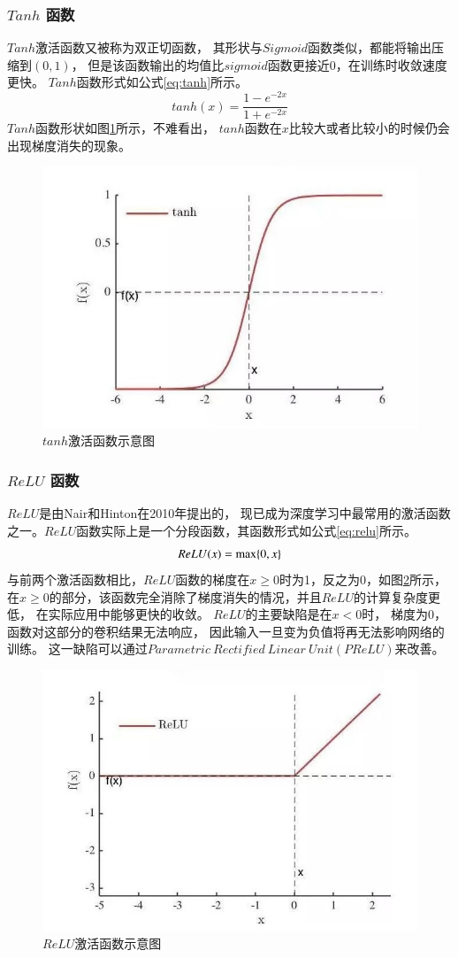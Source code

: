 \subsubsection{$Tanh$ 函数}

$Tanh$激活函数又被称为双正切函数，
其形状与$Sigmoid$函数类似，都能将输出压缩到$(0,1)$，
但是该函数输出的均值比$sigmoid$函数更接近0，在训练时收敛速度更快。
$Tanh$函数形式如公式\eqref{eq:tanh}所示。
\begin{equation}
tanh⁡(x)=\frac{1-e^{-2x}}{1+e^{-2x}}
\label{eq:tanh}
\end{equation}
$Tanh$函数形状如图\ref{fig:tanh}所示，不难看出，
$tanh$函数在$x$比较大或者比较小的时候仍会出现梯度消失的现象。
\begin{figure}[htbp]
\centering
\includegraphics[width=0.6\linewidth]{figures/tanh.png}
\caption{$tanh$激活函数示意图}
\label{fig:tanh}
\end{figure}

\subsubsection{$ReLU$ 函数}

$ReLU$\cite{nair2010rectified}是由Nair和Hinton在2010年提出的，
现已成为深度学习中最常用的激活函数之一。$ReLU$函数实际上是一个分段函数，其函数形式如公式\eqref{eq:relu}所示。
\begin{equation}
\centering
ReLU(x)=\max\{0,x\}
\label{eq:relu}
\end{equation}
与前两个激活函数相比，$ReLU$函数的梯度在$x\geq 0$时为1，反之为0，如图\ref{fig:relu}所示，
在$x\geq 0$的部分，该函数完全消除了梯度消失的情况，并且$ReLU$的计算复杂度更低，
在实际应用中能够更快的收敛。
$ReLU$的主要缺陷是在$x<0$时，
梯度为0，函数对这部分的卷积结果无法响应，
因此输入一旦变为负值将再无法影响网络的训练。
这一缺陷可以通过$Parametric~Rectified~Linear~Unit(PReLU)$\cite{he2015delving}来改善。
\begin{figure}[htbp]
\centering
\includegraphics[width=0.6\linewidth]{figures/relu.png}
\caption{$ReLU$激活函数示意图}
\label{fig:relu}
\end{figure}

